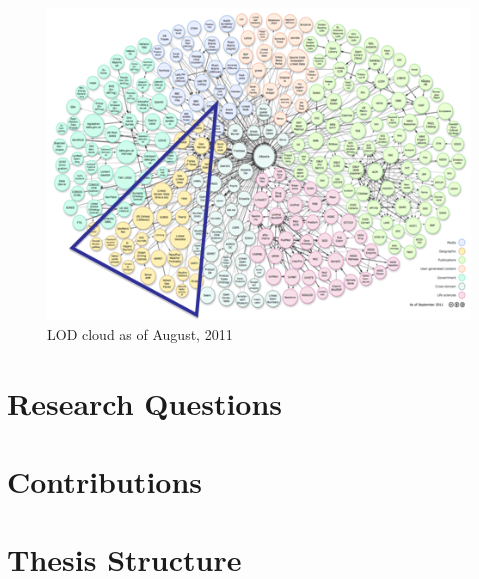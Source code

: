 \begin{figure}[ht!]
\includegraphics[scale=0.9]{img/lod-diagram-2011.png}
\caption{LOD cloud as of August, 2011}
\label{fig:lodcloud2011}
\end{figure}

\begin{figure}[ht!]
\end{figure}



\section{Research Questions}
\label{sec:questions}

\section{Contributions}
\label{sec:contributions}

\section{Thesis Structure}
\label{sec:thesis-structure}